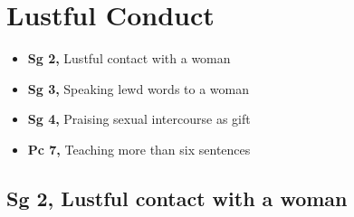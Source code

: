 \chapter{Lustful Conduct}

\begin{itemize}
\tightlist
\item
  \textbf{Sg 2,} Lustful contact with a woman
\item
  \textbf{Sg 3,} Speaking lewd words to a woman
\item
  \textbf{Sg 4,} Praising sexual intercourse as gift
\item
  \textbf{Pc 7,} Teaching more than six sentences
\end{itemize}

\section{Sg 2, Lustful contact with a woman}

